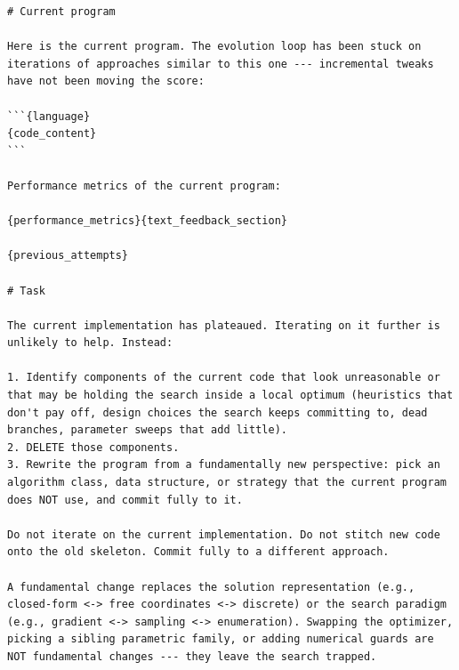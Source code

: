 \begin{ttcolorbox}
\begin{lstlisting}[style=prompt]
# Current program

Here is the current program. The evolution loop has been stuck on iterations of approaches similar to this one --- incremental tweaks have not been moving the score:

```{language}
{code_content}
```

Performance metrics of the current program:

{performance_metrics}{text_feedback_section}

{previous_attempts}

# Task

The current implementation has plateaued. Iterating on it further is unlikely to help. Instead:

1. Identify components of the current code that look unreasonable or that may be holding the search inside a local optimum (heuristics that don't pay off, design choices the search keeps committing to, dead branches, parameter sweeps that add little).
2. DELETE those components.
3. Rewrite the program from a fundamentally new perspective: pick an algorithm class, data structure, or strategy that the current program does NOT use, and commit fully to it.

Do not iterate on the current implementation. Do not stitch new code onto the old skeleton. Commit fully to a different approach.

A fundamental change replaces the solution representation (e.g., closed-form <-> free coordinates <-> discrete) or the search paradigm (e.g., gradient <-> sampling <-> enumeration). Swapping the optimizer, picking a sibling parametric family, or adding numerical guards are NOT fundamental changes --- they leave the search trapped.


\end{lstlisting}
\end{ttcolorbox}
